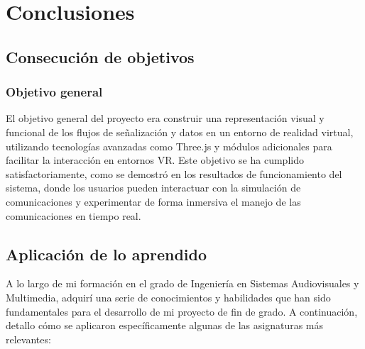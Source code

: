 \documentclass[a4paper, 12pt]{book}
\begin{document}

\cleardoublepage
\chapter{Conclusiones}
\label{chap:conclusiones}


\section{Consecución de objetivos}
\label{sec:consecucion-objetivos}

\subsection{Objetivo general}
El objetivo general del proyecto era construir una representación visual y funcional de los flujos de señalización y 
datos en un entorno de realidad virtual, utilizando tecnologías avanzadas como Three.js y módulos adicionales para facilitar 
la interacción en entornos VR. Este objetivo se ha cumplido satisfactoriamente, como se demostró en los resultados de funcionamiento 
del sistema, donde los usuarios pueden interactuar con la simulación de comunicaciones y experimentar de forma inmersiva el manejo de 
las comunicaciones en tiempo real.


\section{Aplicación de lo aprendido}
\label{sec:aplicacion}

A lo largo de mi formación en el grado de Ingeniería en Sistemas Audiovisuales y Multimedia, adquirí una serie de conocimientos y 
habilidades que han sido fundamentales para el desarrollo de mi proyecto de fin de grado. A continuación, detallo cómo se aplicaron 
específicamente algunas de las asignaturas más relevantes:
\end{document}
